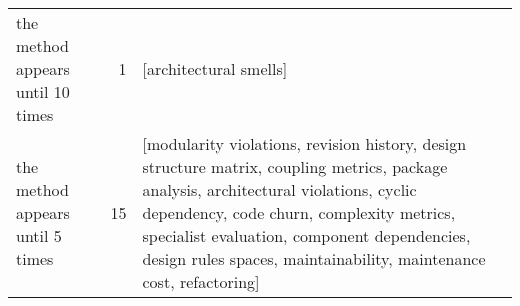 \begin{tabular}{lrl}
     the method appears until 10 times &      1 &                                                                                                                                                                                                                                                                                                                                                                                                                                                                                                                                                                                                                                                                                                                                                                                                                                                                                                                                                                                                                                                                                                                                                                                                                                                                                                                                                                                                                                                                                                              [architectural smells] \\
      the method appears until 5 times &     15 &                                                                                                                                                                                                                                                                                                                                                                                                                                                                                                                                                                                                                                                                                                                                                                                                                                                                                                                                                                                                                                                                                                                                                                                                                             [modularity violations, revision history, design structure matrix, coupling metrics, package analysis, architectural violations, cyclic dependency, code churn, complexity metrics, specialist evaluation, component dependencies, design rules spaces, maintainability, maintenance cost, refactoring] \\

\end{tabular}
